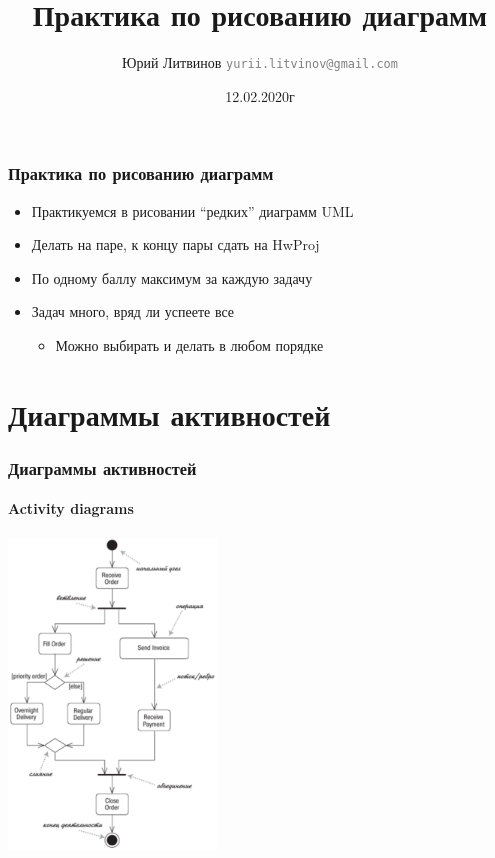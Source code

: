 \documentclass[xetex,mathserif,serif]{beamer}
\title{Практика по рисованию диаграмм}
\author[Юрий Литвинов]{Юрий Литвинов \newline \textcolor{gray}{\small\texttt{yurii.litvinov@gmail.com}}}
\date{12.02.2020г}
\begin{document}
	
	\frame{\titlepage}

	\begin{frame}
		\frametitle{Практика по рисованию диаграмм}
		\begin{itemize}
			\item Практикуемся в рисовании ``редких'' диаграмм UML
			\item Делать на паре, к концу пары сдать на HwProj
			\item По одному баллу максимум за каждую задачу
			\item Задач много, вряд ли успеете все
			\begin{itemize}
				\item Можно выбирать и делать в любом порядке
			\end{itemize}
		\end{itemize}
	\end{frame}

	\section{Диаграммы активностей}

	\begin{frame}
		\frametitle{Диаграммы активностей}
		\framesubtitle{Activity diagrams}
		\begin{center}
			\includegraphics[width=0.415\textwidth]{activityDiagram.png}
		\end{center}
	\end{frame}
\end{document}
